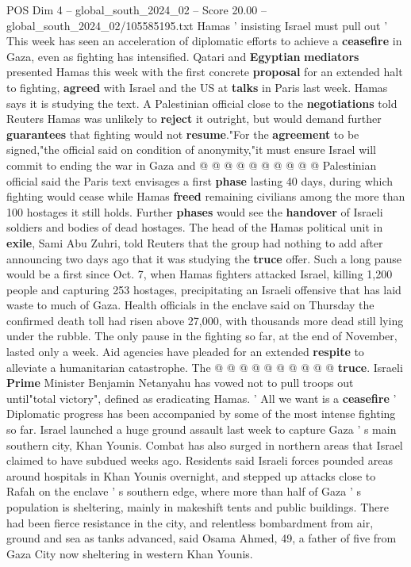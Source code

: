 \begin{textsample}{POS Dim 4 – global\_south\_2024\_02 – Score 20.00 – global\_south\_2024\_02/105585195.txt}
Hamas ' insisting Israel must pull out ' This week has seen an acceleration of diplomatic efforts to achieve a \textbf{ceasefire} in Gaza, even as fighting has intensified.
Qatari and \textbf{Egyptian} \textbf{mediators} presented Hamas this week with the first concrete \textbf{proposal} for an extended halt to fighting, \textbf{agreed} with Israel and the US at \textbf{talks} in Paris last week.
Hamas says it is studying the text.
A Palestinian official close to the \textbf{negotiations} told Reuters Hamas was unlikely to \textbf{reject} it outright, but would demand further \textbf{guarantees} that fighting would not \textbf{resume}."For the \textbf{agreement} to be signed,"the official said on condition of anonymity,"it must ensure Israel will commit to ending the war in Gaza and @ @ @ @ @ @ @ @ @ @ Palestinian official said the Paris text envisages a first \textbf{phase} lasting 40 days, during which fighting would cease while Hamas \textbf{freed} remaining civilians among the more than 100 hostages it still holds.
Further \textbf{phases} would see the \textbf{handover} of Israeli soldiers and bodies of dead hostages.
The head of the Hamas political unit in \textbf{exile}, Sami Abu Zuhri, told Reuters that the group had nothing to add after announcing two days ago that it was studying the \textbf{truce} offer.
Such a long pause would be a first since Oct. 7, when Hamas fighters attacked Israel, killing 1,200 people and capturing 253 hostages, precipitating an Israeli offensive that has laid waste to much of Gaza.
Health officials in the enclave said on Thursday the confirmed death toll had risen above 27,000, with thousands more dead still lying under the rubble.
The only pause in the fighting so far, at the end of November, lasted only a week.
Aid agencies have pleaded for an extended \textbf{respite} to alleviate a humanitarian catastrophe.
The @ @ @ @ @ @ @ @ @ @ \textbf{truce}.
Israeli \textbf{Prime} Minister Benjamin Netanyahu has vowed not to pull troops out until"total victory", defined as eradicating Hamas. ' All we want is a \textbf{ceasefire} ' Diplomatic progress has been accompanied by some of the most intense fighting so far.
Israel launched a huge ground assault last week to capture Gaza ' s main southern city, Khan Younis.
Combat has also surged in northern areas that Israel claimed to have subdued weeks ago.
Residents said Israeli forces pounded areas around hospitals in Khan Younis overnight, and stepped up attacks close to Rafah on the enclave ' s southern edge, where more than half of Gaza ' s population is sheltering, mainly in makeshift tents and public buildings.
There had been fierce resistance in the city, and relentless bombardment from air, ground and sea as tanks advanced, said Osama Ahmed, 49, a father of five from Gaza City now sheltering in western Khan Younis.

\end{textsample}
